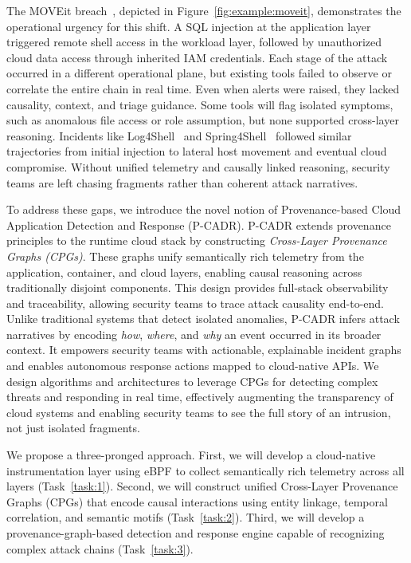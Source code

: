The MOVEit breach~\cite{progress_moveit_cve2023}, depicted in Figure~\ref{fig:example:moveit}, demonstrates the operational urgency for this shift. A SQL injection at the application layer triggered remote shell access in the workload layer, followed by unauthorized cloud data access through inherited IAM credentials. Each stage of the attack occurred in a different operational plane, but existing tools failed to observe or correlate the entire chain in real time. Even when alerts were raised, they lacked causality, context, and triage guidance. Some tools will flag isolated symptoms, such as anomalous file access or role assumption, but none supported cross-layer reasoning. Incidents like Log4Shell~\cite{cisa_log4j} and Spring4Shell~\cite{intruder_spring4shell} followed similar trajectories from initial injection to lateral host movement and eventual cloud compromise. Without unified telemetry and causally linked reasoning, security teams are left chasing fragments rather than coherent attack narratives.


To address these gaps, we introduce the novel notion of Provenance-based Cloud Application Detection and Response (P-CADR). P-CADR extends provenance principles to the runtime cloud stack by constructing {\it Cross-Layer Provenance Graphs (CPGs)}. These graphs unify semantically rich telemetry from the application, container, and cloud layers, enabling causal reasoning across traditionally disjoint components. This design provides full-stack observability and traceability, allowing security teams to trace attack causality end-to-end. Unlike traditional systems that detect isolated anomalies, P-CADR infers attack narratives by encoding {\it how}, {\it where}, and {\it why} an event occurred in its broader context. It empowers security teams with actionable, explainable incident graphs and enables autonomous response actions mapped to cloud-native APIs. We design algorithms and architectures to leverage CPGs for detecting complex threats and responding in real time, effectively augmenting the transparency of cloud systems and enabling security teams to see the full story of an intrusion, not just isolated fragments.

We propose a three-pronged approach. First, we will develop a cloud-native instrumentation layer using eBPF to collect semantically rich telemetry across all layers (Task~\ref{task:1}). Second, we will construct unified Cross-Layer Provenance Graphs (CPGs) that encode causal interactions using entity linkage, temporal correlation, and semantic motifs (Task~\ref{task:2}). Third, we will develop a provenance-graph-based detection and response engine capable of recognizing complex attack chains (Task~\ref{task:3}).


